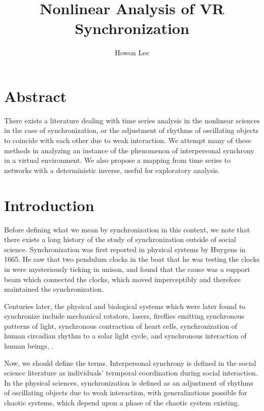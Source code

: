 \documentclass[12pt]{article}
\begin{document}
\title{Nonlinear Analysis of VR Synchronization}
\author{Howon Lee}
\maketitle

\section{Abstract}
There exists a literature dealing with time series analysis in the nonlinear sciences in the case of synchronization, or the adjustment of rhythms of oscillating objects to coincide with each other due to weak interaction. We attempt many of these methods in analyzing an instance of the phenomenon of interpersonal synchrony in a virtual environment. We also propose a mapping from time series to networks with a deterministic inverse, useful for exploratory analysis.


\section{Introduction}

Before defining what we mean by synchronization in this context, we note that there exists a long history of the study of synchronization outside of social science. Synchronization was first reported in physical systems by Huygens in 1665. He saw that two pendulum clocks in the boat that he was testing the clocks in were mysteriously ticking in unison, and found that the cause was a support beam which connected the clocks, which moved imperceptibly and therefore maintained the synchronization\cite{physsync}.

Centuries later, the physical and biological systems which were later found to synchronize include mechanical rotators, lasers, fireflies emitting synchronous patterns of light, synchronous contraction of heart cells, synchronization of human circadian rhythm to a solar light cycle, and synchronous interaction of human beings\cite{syncreview}, \cite{physsync}.

Now, we should define the terms. Interpersonal synchrony is defined in the social science literature as individuals' termporal coordination during social interaction\cite{socialsync}. In the physical sciences, synchronization is defined as an adjustment of rhythms of oscillating objects due to weak interaction, with generalizations possible for chaotic systems, which depend upon a phase of the chaotic system existing\cite{physsync}.
\end{document}
